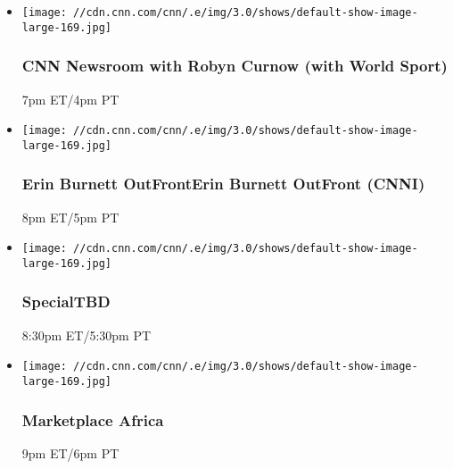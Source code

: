 \begin{itemize}
\item
  \texttt{[image: //cdn.cnn.com/cnn/.e/img/3.0/shows/default-show-image-large-169.jpg]}

  \hypertarget{cnn-newsroom-with-robyn-curnow-with-world-sport}{%
  \subsubsection{CNN Newsroom with Robyn Curnow (with World
  Sport)}\label{cnn-newsroom-with-robyn-curnow-with-world-sport}}

  7pm ET/4pm PT
\end{itemize}

\begin{itemize}
\item
  \texttt{[image: //cdn.cnn.com/cnn/.e/img/3.0/shows/default-show-image-large-169.jpg]}

  \hypertarget{erin-burnett-outfronterin-burnett-outfront-cnni--4}{%
  \subsubsection{Erin Burnett OutFrontErin Burnett OutFront (CNNI)
  }\label{erin-burnett-outfronterin-burnett-outfront-cnni--4}}

  8pm ET/5pm PT
\end{itemize}

\begin{itemize}
\item
  \texttt{[image: //cdn.cnn.com/cnn/.e/img/3.0/shows/default-show-image-large-169.jpg]}

  \hypertarget{specialtbd--4}{%
  \subsubsection{SpecialTBD }\label{specialtbd--4}}

  8:30pm ET/5:30pm PT
\end{itemize}

\begin{itemize}
\item
  \texttt{[image: //cdn.cnn.com/cnn/.e/img/3.0/shows/default-show-image-large-169.jpg]}

  \hypertarget{marketplace-africa-4}{%
  \subsubsection{Marketplace Africa}\label{marketplace-africa-4}}

  9pm ET/6pm PT
\end{itemize}

